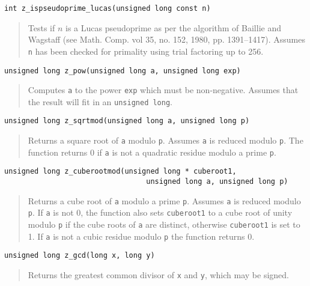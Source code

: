 \documentclass[a4paper,10pt]{article}
\newcommand{\code}{\lstinline}
\begin{document}
\begin{lstlisting}
int z_ispseudoprime_lucas(unsigned long const n)
\end{lstlisting}
\begin{quote}
Tests if $n$ is a Lucas pseudoprime as per the algorithm of Baillie and Wagstaff (see Math. Comp. vol 35, no. 152, 1980, pp. 1391--1417).  Assumes \code{n} has been checked for primality using trial factoring up to 256. 
\end{quote}

\begin{lstlisting}
unsigned long z_pow(unsigned long a, unsigned long exp)
\end{lstlisting}
\begin{quote}
Computes \code{a} to the power \code{exp} which must be non-negative. Assumes that the result will fit in an \code{unsigned long}.
\end{quote}

\begin{lstlisting}
unsigned long z_sqrtmod(unsigned long a, unsigned long p)
\end{lstlisting}
\begin{quote}
Returns a square root of \code{a} modulo \code{p}. Assumes \code{a} is reduced modulo \code{p}. The function returns 0 if \code{a} is not a quadratic residue modulo a prime \code{p}.
\end{quote}

\begin{lstlisting}
unsigned long z_cuberootmod(unsigned long * cuberoot1, 
                                 unsigned long a, unsigned long p)
\end{lstlisting}
\begin{quote}
Returns a cube root of \code{a} modulo a prime \code{p}. Assumes \code{a} is reduced modulo \code{p}. If \code{a} is not 0, the function also sets \code{cuberoot1} to a cube root of unity modulo \code{p} if the cube roots of \code{a} are distinct, otherwise \code{cuberoot1} is set to 1. If \code{a} is not a cubic residue modulo \code{p} the function returns 0.
\end{quote}

\begin{lstlisting}
unsigned long z_gcd(long x, long y)
\end{lstlisting}
\begin{quote}
Returns the greatest common divisor of \code{x} and \code{y}, which may be signed.
\end{quote}
\end{document}
